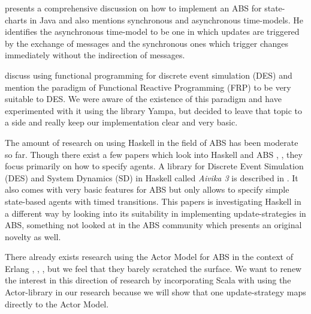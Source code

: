 \cite{yuxuan_agent-based_2016} presents a comprehensive discussion on how to implement an ABS for state-charts in Java and also mentions synchronous and asynchronous time-models. He identifies the asynchronous time-model to be one in which updates are triggered by the exchange of messages and the synchronous ones which trigger changes immediately without the indirection of messages.

\medskip

\cite{jankovic_functional_2007} discuss using functional programming for discrete event simulation (DES) and mention the paradigm of Functional Reactive Programming (FRP) to be very suitable to DES. We were aware of the existence of this paradigm and have experimented with it using the library Yampa, but decided to leave that topic to a side and really keep our implementation clear and very basic.

\medskip

The amount of research on using Haskell in the field of ABS has been moderate so far. Though there exist a few papers which look into Haskell and ABS \cite{de_jong_suitability_2014}, \cite{sulzmann_specifying_2007}, \cite{jankovic_functional_2007} they focus primarily on how to specify agents. A library for Discrete Event Simulation (DES) and System Dynamics (SD) in Haskell called \textit{Aivika 3} is described in \cite{sorokin_aivika_2015}. It also comes with very basic features for ABS but only allows to specify simple state-based agents with timed transitions. This papers is investigating Haskell in a different way by looking into its suitability in implementing update-strategies in ABS, something not looked at in the ABS community which presents an original novelty as well.

\medskip

There already exists research using the Actor Model \cite{agha_actors:_1986} for ABS in the context of Erlang \cite{varela_modelling_2004}, \cite{di_stefano_using_2005}, \cite{di_stefano_exat:_2007}, \cite{sher_agent-based_2013} but we feel that they barely scratched the surface. We want to renew the interest in this direction of research by incorporating Scala with using the Actor-library in our research because we will show that one update-strategy maps directly to the Actor Model.